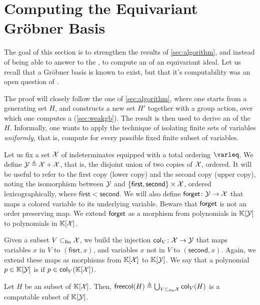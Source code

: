 \section{Computing the Equivariant Gröbner Basis}
\label{sec:equivariant-grobner-basis}

The goal of this section is to strengthen the results of \cref{sec:algorithm},
and instead of being able to answer to the , to compute an  of an equivariant ideal.
Let us recall that a Gröbner basis is known to exist, but that it's
computability was an open question of \cite{GHOLAS24}.

The proof will closely follow the one of \cref{sec:algorithm}, where one starts
from a generating set $H$, and constructs a new set $H'$ together with a group
action, over which one computes a  (\cref{sec:weakgb}).
The result is then used to derive an  of the
 $H$. Informally, one wants to 
apply the technique of isolating finite sets of variables \emph{uniformly},
that is, compute  for every possible fixed 
finite subset of variables. 


Let us fix a set $\mathcal{X}$ of indeterminates equipped with a total ordering
$\varleq$. We define $\mathcal{Y} \triangleq \mathcal{X} + \mathcal{X}$, that is, the
disjoint union of two copies of $\mathcal{X}$, ordered. It will be useful to refer
to the first copy (lower copy) and the second copy (upper copy), noting the
isomorphism between $\mathcal{Y}$ and $\{ \mathsf{first}, \mathsf{second} \}
\times \mathcal{X}$, ordered lexicographically, where $\mathsf{first} <
\mathsf{second}$. We will also define $\mathop{\mathsf{forget}} \colon \mathcal{Y} \to
\mathcal{X}$ that maps a colored variable to its underlying variable.
Beware that $\mathop{\mathsf{forget}}$ is not an order preserving map.
We extend $\mathop{\mathsf{forget}}$ as a morphism from polynomials in
$\mathbb{K}[\mathcal{Y}]$ to polynomials in $\mathbb{K}[\mathcal{X}]$.

Given a subset $V \subset_{\text{fin}} \mathcal{X}$, we build the injection $\mathop{\mathsf{col}_{V}}
\colon \mathcal{X} \to \mathcal{Y}$ that maps variables $x$ in $V$ to
$(\mathsf{fisrt}, x)$, and variables $x$ not in $V$ to $(\mathsf{second}, x)$.
Again, we extend these maps as morphisms from $\mathbb{K}[\mathcal{X}]$ to
$\mathbb{K}[\mathcal{Y}]$. We say that a polynomial $p \in \mathbb{K}[\mathcal{Y}]$
is  if $p \in \mathop{\mathsf{col}_{V}}(\mathbb{K}[\mathcal{X}])$.

\begin{lemma}
  \label{lem:v-saturation-computable}
  Let $H$ be an  subset of $\mathbb{K}[\mathcal{X}]$.
  Then, $\mathop{\mathsf{freecol}}(H) \triangleq \bigcup_{V \subset_{\text{fin}} \mathcal{X}} \mathop{\mathsf{col}_{V}}(H)$
  is a computable  subset of $\mathbb{K}[\mathcal{Y}]$.
\end{lemma}


